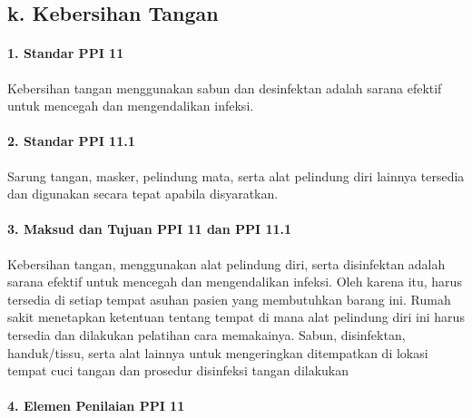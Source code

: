 \documentclass[
]{book}
\begin{document}
\hypertarget{k.-kebersihan-tangan}{%
\subsection*{k. Kebersihan Tangan}\label{k.-kebersihan-tangan}}

\hypertarget{standar-ppi-11}{%
\paragraph*{1. Standar PPI 11}\label{standar-ppi-11}}

Kebersihan tangan menggunakan sabun dan desinfektan adalah sarana efektif untuk mencegah dan mengendalikan infeksi.

\hypertarget{standar-ppi-11.1}{%
\paragraph*{2. Standar PPI 11.1}\label{standar-ppi-11.1}}

Sarung tangan, masker, pelindung mata, serta alat pelindung diri lainnya tersedia dan digunakan secara tepat apabila disyaratkan.

\hypertarget{maksud-dan-tujuan-ppi-11-dan-ppi-11.1}{%
\paragraph*{3. Maksud dan Tujuan PPI 11 dan PPI 11.1}\label{maksud-dan-tujuan-ppi-11-dan-ppi-11.1}}

Kebersihan tangan, menggunakan alat pelindung diri, serta disinfektan adalah sarana efektif untuk mencegah dan mengendalikan infeksi. Oleh karena itu, harus tersedia di setiap tempat asuhan pasien yang membutuhkan barang ini. Rumah sakit menetapkan ketentuan tentang tempat di mana alat pelindung diri ini harus tersedia dan dilakukan pelatihan cara memakainya. Sabun, disinfektan, handuk/tissu, serta alat lainnya untuk mengeringkan ditempatkan di lokasi tempat cuci tangan dan prosedur disinfeksi tangan dilakukan

\hypertarget{elemen-penilaian-ppi-11}{%
\paragraph*{4. Elemen Penilaian PPI 11}\label{elemen-penilaian-ppi-11}}
\end{document}

